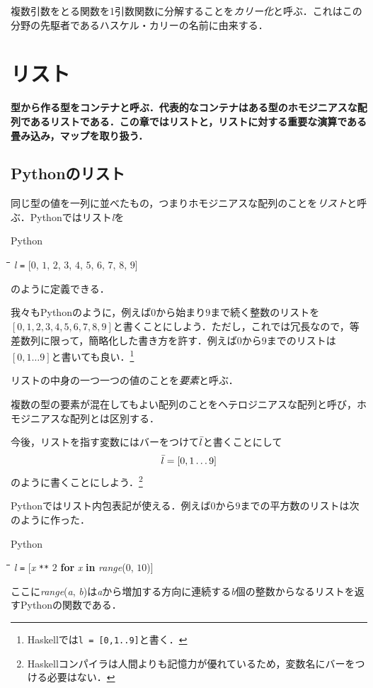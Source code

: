 \documentclass[twocolumn]{jsbook}
\newcommand{\keyword}[1]{{\emph{#1}}}
\newcommand{\code}[1]{\texttt{#1}}
\newenvironment{leader}{\begingroup\bf}{\endgroup}
\newenvironment{pythoncode}{\begin{itembox}[r]{Python}}{\end{itembox}}
\newenvironment{python}{\begin{tabbing}\hspace*{1em}\=\hspace*{1em}\=\hspace*{1em}\=\hspace*{1em}\=\kill}{\end{tabbing}}
\newcommand{\pthnId}[1]{\textit{#1}}
\newcommand{\pthnKeyword}[1]{\textbf{#1}}
\newcommand{\pthnOp}[1]{\texttt{#1}}
\newcommand{\hsklList}[1]{\Bar{#1}}
\begin{document}
複数引数をとる関数を1引数関数に分解することを\keyword{カリー化}と呼ぶ．これはこの分野の先駆者であるハスケル・カリーの名前に由来する．



\chapter{リスト}
\begin{leader}
型から作る型をコンテナと呼ぶ．代表的なコンテナはある型のホモジニアスな配列であるリストである．この章ではリストと，リストに対する重要な演算である畳み込み，マップを取り扱う．
\end{leader}


\section{Pythonのリスト}

同じ型の値を一列に並べたもの，つまりホモジニアスな配列のことを\keyword{リスト}と呼ぶ．Pythonではリスト\pthnId{l}を
\begin{pythoncode}
\begin{python}
\pthnId{l} \pthnOp{=} [$0$, $1$, $2$, $3$, $4$, $5$, $6$, $7$, $8$, $9$]
\end{python}
\end{pythoncode}
のように定義できる．

我々もPythonのように，例えば$0$から始まり$9$まで続く整数のリストを$[0,1,2,3,4,5,6,7,8,9]$と書くことにしよう．ただし，これでは冗長なので，等差数列に限って，簡略化した書き方を許す．例えば$0$から$9$までのリストは$[0,1\dots9]$と書いても良い．\footnote{Haskellでは\code{l = [0,1..9]}と書く．}

リストの中身の一つ一つの値のことを\keyword{要素}と呼ぶ．

複数の型の要素が混在してもよい配列のことをヘテロジニアスな配列と呼び，ホモジニアスな配列とは区別する．

今後，リストを指す変数にはバーをつけて$\hsklList{l}$と書くことにして$$\hsklList{l}=[0,1\dots9]$$のように書くことにしよう．\footnote{Haskellコンパイラは人間よりも記憶力が優れているため，変数名にバーをつける必要はない．}

Pythonではリスト内包表記が使える．例えば$0$から$9$までの平方数のリストは次のように作った．
\begin{pythoncode}
\begin{python}
\pthnId{l} \pthnOp{=} [\pthnId{x} \pthnOp{**} $2$ \pthnKeyword{for} \pthnId{x} \pthnKeyword{in} \pthnId{range}($0$, $10$)]
\end{python}
\end{pythoncode}
ここに\pthnId{range}(\pthnId{a}, \pthnId{b})は\pthnId{a}から増加する方向に連続する\pthnId{b}個の整数からなるリストを返すPythonの関数である．
\end{document}
